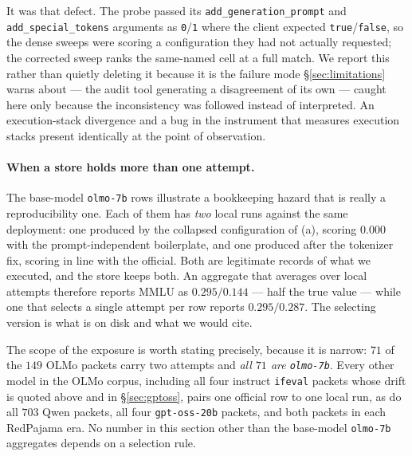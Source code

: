 It was that defect. The probe passed its \texttt{add\_generation\_prompt} and
\texttt{add\_special\_tokens} arguments as \texttt{0}/\texttt{1} where the client
expected \texttt{true}/\texttt{false}, so the dense sweeps were scoring a
configuration they had not actually requested; the corrected sweep ranks the
same-named cell at a full match. We report this rather than quietly deleting it
because it is the failure mode \S\ref{sec:limitations} warns about --- the audit
tool generating a disagreement of its own --- caught here only because the
inconsistency was followed instead of interpreted. An execution-stack divergence
and a bug in the instrument that measures execution stacks present identically at
the point of observation.

\paragraph{When a store holds more than one attempt.} The base-model
\texttt{olmo-7b} rows illustrate a bookkeeping hazard that is really a
reproducibility one. Each of them has \emph{two} local runs against the same
deployment: one produced by the collapsed configuration of (a), scoring $0.000$
with the prompt-independent boilerplate, and one produced after the tokenizer fix,
scoring in line with the official. Both are legitimate records of what we
executed, and the store keeps both. An aggregate that averages over local attempts
therefore reports MMLU as $0.295/0.144$ --- half the true value --- while one that
selects a single attempt per row reports $0.295/0.287$. The selecting version is
what is on disk and what we would cite.

The scope of the exposure is worth stating precisely, because it is narrow: $71$
of the $149$ OLMo packets carry two attempts and \emph{all $71$ are
\texttt{olmo-7b}}. Every other model in the OLMo corpus, including all four
instruct \texttt{ifeval} packets whose drift is quoted above and in
\S\ref{sec:gptoss}, pairs one official row to one local run, as do all $703$ Qwen
packets, all four \texttt{gpt-oss-20b} packets, and both packets in each
RedPajama era. No number in this section other than the base-model
\texttt{olmo-7b} aggregates depends on a selection rule.

